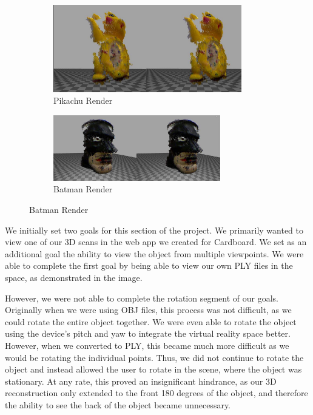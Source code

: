 \documentclass[11pt,oneside,english]{article}
\begin{document}
\begin{figure}[h]
  \centering
  \begin{subfigure}[b]{0.45\textwidth}
    \includegraphics[width=0.9\textwidth]{pika4}
    \caption{Pikachu Render}
    \label{fig:awesome_image}
  \end{subfigure}
  \begin{subfigure}[b]{0.45\textwidth}
    \includegraphics[width=0.8\textwidth]{batman}
    \caption{Batman Render}
    \label{fig:awesome_image}
  \end{subfigure}
\end{figure}

We initially set two goals for this section of the project. We primarily wanted
to view one of our 3D scans in the web app we created for Cardboard. We set as
an additional goal the ability to view the object from multiple viewpoints. We
were able to complete the first goal by being able to view our own PLY files in
the space, as demonstrated in the image. 

However, we were not able to complete the rotation segment of our goals.
Originally when we were using OBJ files, this process was not difficult, as we
could rotate the entire object together. We were even able to rotate the
object using the device's pitch and yaw to integrate the virtual reality space
better. However, when we converted to PLY, this became much more difficult as
we would be rotating the individual points. Thus, we did not continue to
rotate the object and instead allowed the user to rotate in the scene, where
the object was stationary. At any rate, this proved an insignificant
hindrance, as our 3D reconstruction only extended to the front 180 degrees of
the object, and therefore the ability to see the back of the object became
unnecessary.
\end{document}
